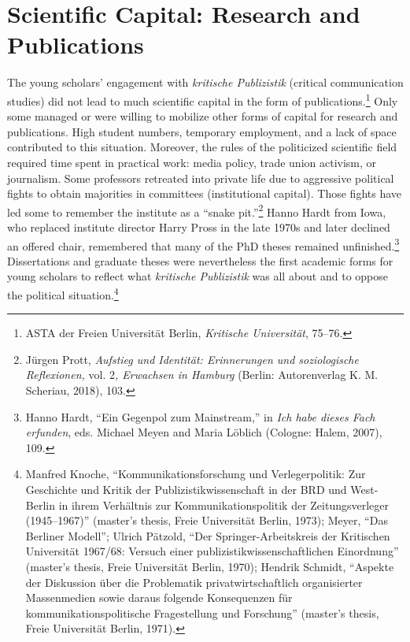 \documentclass{tufte-handout}
\begin{document}
\hypertarget{scientific-capital-research-and-publications}{%
\section{Scientific Capital: Research and
Publications}\label{scientific-capital-research-and-publications}}

The young scholars' engagement with \emph{kritische Publizistik}
(critical communication studies) did not lead to much scientific capital
in the form of publications.\footnote{ASTA der Freien Universität
  Berlin, \emph{Kritische Universität}, 75--76.} Only some managed or
were willing to mobilize other forms of capital for research and
publications. High student numbers, temporary employment, and a lack of
space contributed to this situation. Moreover, the rules of the
politicized scientific field required time spent in practical work:
media policy, trade union activism, or journalism. Some professors
retreated into private life due to aggressive political fights to obtain
majorities in committees (institutional capital). Those fights have led
some to remember the institute as a ``snake pit.''\footnote{Jürgen
  Prott, \emph{Aufstieg und Identität: Erinnerungen und soziologische
  Reflexionen,} vol. 2\emph{, Erwachsen in Hamburg} (Berlin:
  Autorenverlag K. M. Scheriau, 2018), 103.} Hanno Hardt from Iowa, who
replaced institute director Harry Pross in the late 1970s and later
declined an offered chair, remembered that many of the PhD theses
remained unfinished.\footnote{Hanno Hardt, ``Ein Gegenpol zum
  Mainstream,'' in \emph{Ich habe dieses Fach erfunden}, eds. Michael
  Meyen and Maria Löblich (Cologne: Halem, 2007), 109.} Dissertations
and graduate theses were nevertheless the first academic forms for young
scholars to reflect what \emph{kritische Publizistik} was all about and
to oppose the political situation.\footnote{Manfred Knoche,
  ``Kommunikationsforschung und Verlegerpolitik: Zur Geschichte und
  Kritik der Publizistikwissenschaft in der BRD und West-Berlin in ihrem
  Verhältnis zur Kommunikationspolitik der Zeitungsverleger
  (1945--1967)'' (master's thesis, Freie Universität Berlin, 1973);
  Meyer, ``Das Berliner Modell''; Ulrich Pätzold, ``Der
  Springer-Arbeitskreis der Kritischen Universität 1967/68: Versuch
  einer publizistikwissenschaftlichen Einordnung'' (master's thesis,
  Freie Universität Berlin, 1970); Hendrik Schmidt, ``Aspekte der
  Diskussion über die Problematik privatwirtschaftlich organisierter
  Massenmedien sowie daraus folgende Konsequenzen für
  kommunikationspolitische Fragestellung und Forschung'' (master's
  thesis, Freie Universität Berlin, 1971).}
\end{document}
